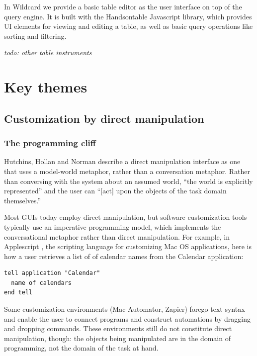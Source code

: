 \documentclass[sigplan,10pt,anonymous,review]{acmart}
\begin{document}
In Wildcard we provide a basic table editor as the user interface on top
of the query engine. It is built with the Handsontable Javascript
library, which provides UI elements for viewing and editing a table, as
well as basic query operations like sorting and filtering.

\emph{todo: other table instruments}

\hypertarget{sec:themes}{%
\section{Key themes}\label{sec:themes}}

\hypertarget{customization-by-direct-manipulation}{%
\subsection{Customization by direct
manipulation}\label{customization-by-direct-manipulation}}

\hypertarget{the-programming-cliff}{%
\subsubsection{The programming cliff}\label{the-programming-cliff}}

Hutchins, Hollan and Norman \citep{hutchins1985} describe a direct
manipulation interface as one that uses a model-world metaphor, rather
than a conversation metaphor. Rather than conversing with the system
about an assumed world, ``the world is explicitly represented'' and the
user can ``{[}act{]} upon the objects of the task domain themselves.''

Most GUIs today employ direct manipulation, but software customization
tools typically use an imperative programming model, which implements
the conversational metaphor rather than direct manipulation. For
example, in Applescript \citep{cook2007}, the scripting language for
customizing Mac OS applications, here is how a user retrieves a list of
of calendar names from the Calendar application:

\begin{verbatim}
tell application "Calendar"
  name of calendars
end tell
\end{verbatim}

Some customization environments (Mac Automator, Zapier) forego text
syntax and enable the user to connect programs and construct automations
by dragging and dropping commands. These environments still do not
constitute direct manipulation, though: the objects being manipulated
are in the domain of programming, not the domain of the task at hand.
\end{document}
